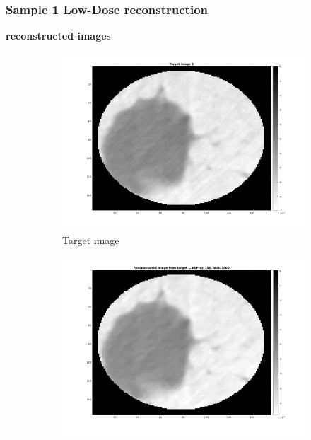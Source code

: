 \documentclass[10pt,a4paper,titlepage]{article}
\begin{document}
		\subsubsection{Sample 1 Low-Dose reconstruction}
		\textbf{reconstructed images}
		\begin{figure}[H]
		
       		\centering
      		\begin{subfigure}[b]{0.32\textwidth}
            	\centering
            	\includegraphics[width=\textwidth]{Sample1/target1.png}
            	\caption{Target image}    
        	\end{subfigure}
        	\begin{subfigure}[b]{0.32\textwidth}  
            	\centering 
            	\includegraphics[width=\textwidth]{Sample1/L-D_5000/156p.png}

\end{subfigure}
\end{figure}
\end{document}

